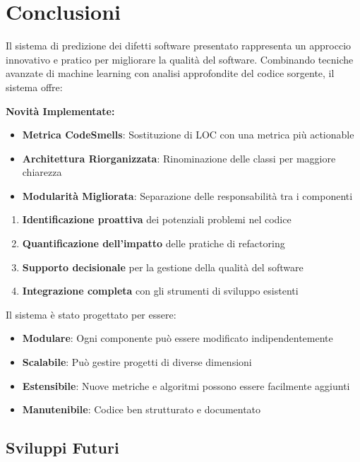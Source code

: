 \documentclass[12pt,a4paper]{article}
\begin{document}
\section{Conclusioni}

Il sistema di predizione dei difetti software presentato rappresenta un approccio innovativo e pratico per migliorare la qualità del software. Combinando tecniche avanzate di machine learning con analisi approfondite del codice sorgente, il sistema offre:

\textbf{Novità Implementate:}
\begin{itemize}
    \item \textbf{Metrica CodeSmells}: Sostituzione di LOC con una metrica più actionable
    \item \textbf{Architettura Riorganizzata}: Rinominazione delle classi per maggiore chiarezza
    \item \textbf{Modularità Migliorata}: Separazione delle responsabilità tra i componenti
\end{itemize}

\begin{enumerate}
    \item \textbf{Identificazione proattiva} dei potenziali problemi nel codice
    \item \textbf{Quantificazione dell'impatto} delle pratiche di refactoring
    \item \textbf{Supporto decisionale} per la gestione della qualità del software
    \item \textbf{Integrazione completa} con gli strumenti di sviluppo esistenti
\end{enumerate}

Il sistema è stato progettato per essere:
\begin{itemize}
    \item \textbf{Modulare}: Ogni componente può essere modificato indipendentemente
    \item \textbf{Scalabile}: Può gestire progetti di diverse dimensioni
    \item \textbf{Estensibile}: Nuove metriche e algoritmi possono essere facilmente aggiunti
    \item \textbf{Manutenibile}: Codice ben strutturato e documentato
\end{itemize}

\subsection{Sviluppi Futuri}
\end{document}
